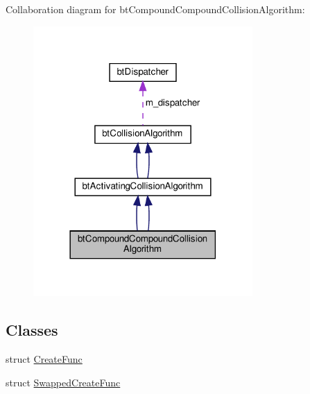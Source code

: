 Collaboration diagram for bt\+Compound\+Compound\+Collision\+Algorithm\+:
\nopagebreak
\begin{figure}[H]
\begin{center}
\leavevmode
\includegraphics[width=237pt]{classbtCompoundCompoundCollisionAlgorithm__coll__graph}
\end{center}
\end{figure}
\subsection*{Classes}
\begin{DoxyCompactItemize}
\item 
struct \hyperlink{structbtCompoundCompoundCollisionAlgorithm_1_1CreateFunc}{Create\+Func}
\item 
struct \hyperlink{structbtCompoundCompoundCollisionAlgorithm_1_1SwappedCreateFunc}{Swapped\+Create\+Func}
\end{DoxyCompactItemize}
